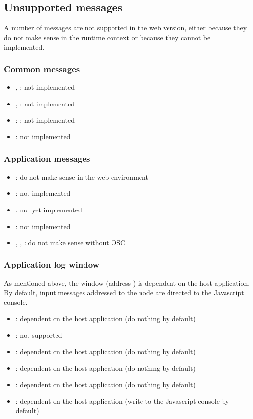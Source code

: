 \documentclass[a4paper,twoside]{article}
\newcommand{\sublevel}[1]	{\subsection{#1}}
\newcommand{\subsublevel}[1]	{\subsubsection{#1}}
\begin{document}
\sublevel{Unsupported messages}
\label{unsupportedMessages}

A number of messages are not supported in the web version, either because they do not make sense in the runtime context or because they cannot be implemented.

\subsublevel{Common messages}
\label{webcommonMessages}

\begin{itemize}
\item {}, : not implemented
\item {}, : not implemented
\item {}: : not implemented
\item {}: not implemented
\end{itemize}

\subsublevel{Application messages}
\label{webappMessages}

\begin{itemize}
\item {}: do not make sense in the web environment
\item {}: not implemented
\item {}: not yet implemented
\item {}: not implemented
\item {}, , : do not make sense without OSC
\end{itemize}

\subsublevel{Application log window}
\label{weblogMessages}

As mentioned above, the  window (address ) is dependent on the host application. By default, input messages addressed to the  node are directed to the Javascript console.

\begin{itemize}
\item {}: dependent on the host application (do nothing by default)
\item {}: not supported
\item {}: dependent on the host application (do nothing by default)
\item {}: dependent on the host application (do nothing by default)
\item {}: dependent on the host application (do nothing by default)
\item {}: dependent on the host application (write to the Javascript console by default)
\end{itemize}
\end{document}
